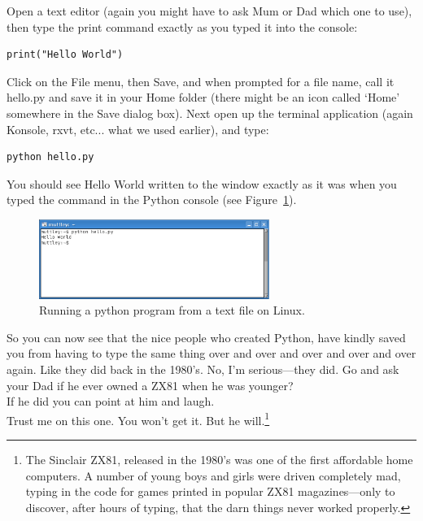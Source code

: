 \begin{LINUX}
Open a text editor (again you might have to ask Mum or Dad which one to use), then type the print command exactly as you typed it into the console:

\begin{listing}
\begin{verbatim}
print("Hello World")
\end{verbatim}
\end{listing}

Click on the File menu, then Save, and when prompted for a file name, call it hello.py and save it in your Home folder (there might be an icon called `Home' somewhere in the Save dialog box).  Next open up the terminal application (again Konsole, rxvt, etc... what we used earlier), and type:

\begin{listing}
\begin{verbatim}
python hello.py
\end{verbatim}
\end{listing}

You should see Hello World written to the window exactly as it was when you typed the command in the Python console (see Figure~\ref{fig9}).

\begin{figure}
\begin{center}
\includegraphics[width=75mm]{figure9.eps}
\end{center}
\caption{Running a python program from a text file on Linux.}\label{fig9}
\end{figure}
\end{LINUX}

So you can now see that the nice people who created Python, have kindly saved you from having to type the same thing over and over and over and over and over again.  Like they did back in the 1980's.  No, I'm serious---they did.  Go and ask your Dad if he ever owned a ZX81 when he was younger?\\

\noindent
If he did you can point at him and laugh.\\

\noindent
Trust me on this one.  You won't get it.  But he will.\footnote{The Sinclair ZX81, released in the 1980's was one of the first affordable home computers.  A number of young boys and girls were driven completely mad, typing in the code for games printed in popular ZX81 magazines---only to discover, after hours of typing, that the darn things never worked properly.}

